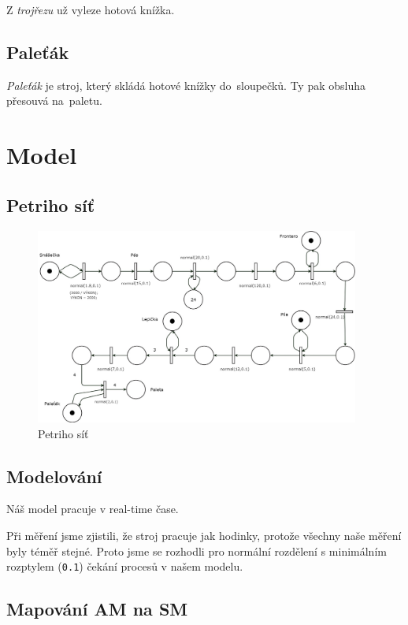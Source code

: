 \documentclass[a4paper, 11pt]{article}
\begin{document}
Z \emph{trojřezu} už vyleze hotová knížka.

\subsection{Paleťák}

\emph{Paleťák} je stroj, který skládá hotové knížky do~sloupečků. Ty pak obsluha přesouvá na~paletu.

\pagebreak

\section{Model}

\subsection{Petriho síť}

\begin{figure}[h]
	\centering
	\includegraphics[width=0.95\textwidth]{petri}
	\caption{Petriho síť}
	\label{petri}
\end{figure}

\subsection{Modelování}

Náš model pracuje v real-time čase.

Při měření jsme zjistili, že stroj pracuje jak hodinky, protože všechny naše měření byly téměř stejné. Proto jsme se rozhodli pro normální rozdělení s minimálním rozptylem (\texttt{0.1}) čekání procesů v našem modelu.

\pagebreak

\subsection{Mapování AM na SM}
\end{document}
